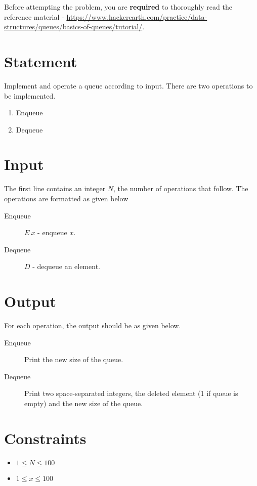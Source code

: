 \documentclass{article}
\begin{document}
Before attempting the problem, you are \textbf{required} to thoroughly read the reference material - \url{https://www.hackerearth.com/practice/data-structures/queues/basics-of-queues/tutorial/}.

\section*{Statement}

Implement and operate a queue according to input. There are two operations to be implemented.

\begin{enumerate}
    \item Enqueue
    \item Dequeue
\end{enumerate}

\section*{Input}

The first line contains an integer $N$, the number of operations that follow. The operations are formatted as given below

\begin{description}
    \item[Enqueue] $E\ x$ - enqueue $x$.
    \item[Dequeue] $D$ - dequeue an element.
\end{description}

\section*{Output}

For each operation, the output should be as given below.

\begin{description}
    \item[Enqueue] Print the new size of the queue.
    \item[Dequeue] Print two space-separated integers, the deleted element (1 if queue is empty) and the new size of the queue.
\end{description}

\section*{Constraints}

\begin{itemize}
    \item $1 \le N \le 100$
    \item $1 \le x \le 100$
\end{itemize}
\end{document}
